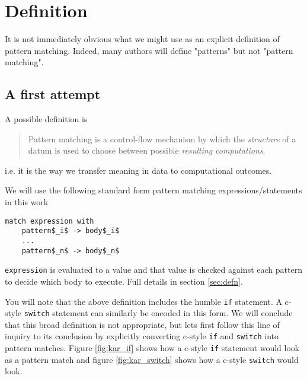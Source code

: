 \documentclass[acmsmall]{acmart}
\begin{document}
\section{Definition}
It is not immediately obvious what we might use as an explicit definition of pattern matching. Indeed, many authors will define "patterns" but not "pattern matching".

\subsection{A first attempt}

A possible definition is 

\begin{quote}
    Pattern matching is a control-flow mechanism by which the \emph{structure} of a datum is used to choose between possible \emph{resulting computations}.
\end{quote}

i.e. it is the way we transfer meaning in data to computational outcomes.

We will use the following standard form pattern matching expressions/statements in this work

\begin{lstlisting}
match expression with 
    pattern$_i$ -> body$_i$
    ...
    pattern$_n$ -> body$_n$
\end{lstlisting}

\lstinline{expression} is evaluated to a value and that value is checked against each pattern to decide which body to execute. Full details in section \ref{sec:defn}.

You will note that the above definition includes the humble \lstinline{if} statement. A c-style \lstinline{switch} statement can similarly be encoded in this form. We will conclude that this broad definition is not appropriate, but lets first follow this line of inquiry to its conclusion by explicitly converting c-style \lstinline{if} and \lstinline{switch} into pattern matches.  Figure \ref{fig:kar_if} shows how a c-style \lstinline{if} statement would look as a pattern match and figure \ref{fig:kar_switch} shows how a c-style \lstinline{switch} would look.
\end{document}
